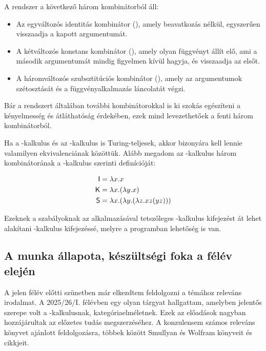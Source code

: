 \documentclass[a4paper,oneside,12pt]{article}
\begin{document}
A rendszer a következő három kombinátorból áll:
\begin{itemize}
  \item Az egyváltozós identitás kombinátor (\Icomb), amely beavatkozás nélkül, egyszerűen visszaadja a kapott argumentumát.
  \item A kétváltozós konstans kombinátor (\Kcomb), amely olyan függvényt állít elő, ami a második argumentumát mindig figyelmen kívül hagyja, és visszaadja az elsőt.
  \item A háromváltozós szubsztitúciós kombinátor (\Scomb), amely az argumentumok szétosztását és a függvényalkalmazás láncolatát végzi.
\end{itemize}

Bár a rendszert általában további kombinátorokkal is ki szokás egészíteni a kényelmesség és átláthatóság érdekében, ezek mind levezethetőek a fenti három kombinátorból.

Ha a \lam-kalkulus és az \ski-kalkulus is Turing-teljesek, akkor bizonyára kell lennie valamilyen ekvivalenciának közöttük. Alább megadom az \ski-kalkulus három kombinátorának a \lam-kalkulus szerinti definícióját:

\[
  \begin{aligned}
    \textsf{I} & = \lambda x.x                              \\
    \textsf{K} & = \lambda x.(\lambda y.x)                  \\
    \textsf{S} & = \lambda x.(\lambda y.(\lambda z.xz(yz)))
  \end{aligned}
\]

Ezeknek a szabályoknak az alkalmazásával tetszőleges \ski-kalkulus kifejezést át lehet alakítani \lam-kalkulus kifejezéssé, melyre a programban lehetőség is van.

\subsection{A munka állapota, készültségi foka a félév elején}
\label{sec:munka-allap-kesz}

A jelen félév előtti szünetben már elkezdtem feldolgozni a témához releváns irodalmat. A 2025/26/I. félévben egy olyan tárgyat hallgattam, amelyben jelentős szerepe volt a \lam-kalkulusnak, kategóriaelméletnek. Ezek az előadások nagyban hozzájárultak az előzetes tudás megszerzéséhez. A konzulensem számos releváns könyvet ajánlott feldolgozásra, többek között Smullyan \cite{smullyanMockMockingbirdOther2000} és Wolfram \cite{wolframCombinatorsCentennialView2020, wolframCombinatorsStoryComputation2020} könyveit és cikkjeit.
\end{document}
